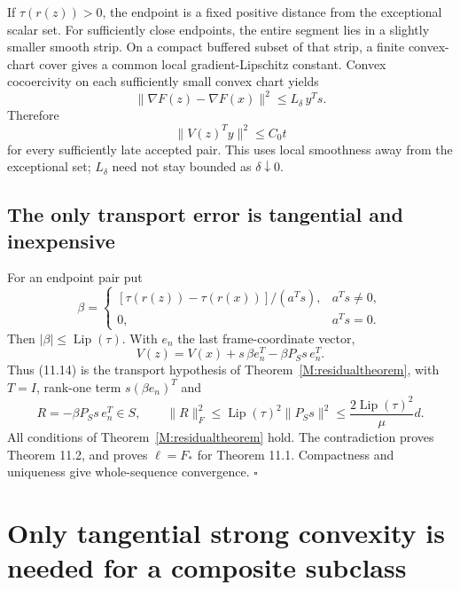 If \(\tau(r(z))>0\), the endpoint is a fixed positive distance from the
exceptional scalar set. For sufficiently close endpoints, the entire
segment lies in a slightly smaller smooth strip. On a compact buffered
subset of that strip, a finite convex-chart cover gives a common local
gradient-Lipschitz constant. Convex cocoercivity on each sufficiently
small convex chart yields \[
 \|\nabla F(z)-\nabla F(x)\|^2\le L_\delta\,y^Ts.
\] Therefore \[
 \|V(z)^Ty\|^2\le C_0t\tag{11.13}
\] for every sufficiently late accepted pair. This uses local smoothness
away from the exceptional set; \(L_\delta\) need not stay bounded as
\(\delta\downarrow0\).



\subsection{The only transport error is tangential and
inexpensive}\label{U:the-only-transport-error-is-tangential-and-inexpensive}

For an endpoint pair put \[
 \beta=\begin{cases}
 [\tau(r(z))-\tau(r(x))]/(a^Ts),&a^Ts\ne0,\\
 0,&a^Ts=0.
 \end{cases}
\] Then \(|\beta|\le\operatorname{Lip}(\tau)\). With \(e_n\) the last
frame-coordinate vector, \[
 \boxed{
 V(z)=V(x)+s\,\beta e_n^T-\beta P_Ss\,e_n^T.
 }\tag{11.14}
\] Thus (11.14) is the transport hypothesis of Theorem~\ref{M:residualtheorem}, with \(T=I\), rank-one term \(s(\beta e_n)^T\) and \[
 R=-\beta P_Ss\,e_n^T\in S,
 \qquad
 \|R\|_F^2\le\operatorname{Lip}(\tau)^2\|P_Ss\|^2
 \le\frac{2\operatorname{Lip}(\tau)^2}{\mu}d.\tag{11.15}
\] All conditions of Theorem~\ref{M:residualtheorem} hold. The contradiction proves Theorem 11.2,
and proves \(\ell=F_*\) for Theorem 11.1. Compactness and uniqueness give
whole-sequence convergence. \(\square\)


\setcounter{section}{5}
\setcounter{theorem}{0}
\setcounter{lemma}{0}
\setcounter{corollary}{0}
\setcounter{proposition}{0}
\setcounter{remark}{0}
\setcounter{equation}{0}


\section{Only tangential strong convexity is needed for a composite
subclass}\label{U:only-tangential-strong-convexity-is-needed-for-a-composite-subclass}

